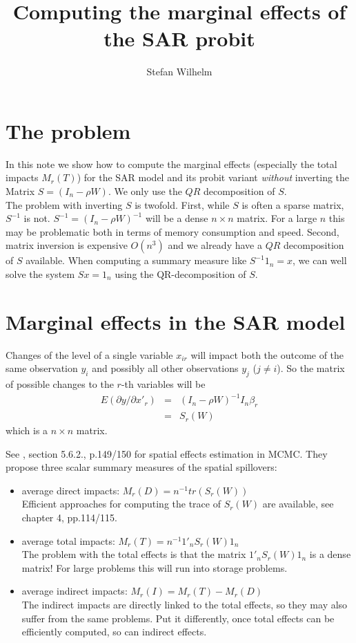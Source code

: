\documentclass[a4paper]{article}
\title{Computing the marginal effects of the SAR probit}
\author{Stefan Wilhelm}
\begin{document}
\maketitle

\section{The problem}
In this note we show how to compute the marginal effects (especially the total impacts $M_r(T)$)
for the SAR model and its probit variant \textit{without} inverting the Matrix $S=(I_n - \rho W)$.
We only use the $QR$ decomposition of $S$.\\
The problem with inverting $S$ is twofold. 
First, while $S$ is often a sparse matrix, $S^{-1}$ is not. $S^{-1}=(I_n - \rho W)^{-1}$ will be a dense
$n \times n$ matrix. For a large $n$ this may be problematic both in terms of memory consumption and speed.
Second, matrix inversion is expensive $O(n^3)$ and we already have a $QR$ decomposition of $S$ available.
When computing a summary measure like $S^{-1} 1_n=x$, we can well solve the system $S x = 1_n$ using the QR-decomposition
of $S$.  

\section{Marginal effects in the SAR model}

Changes of the level of a single variable $x_{ir}$ will impact both the outcome of the same observation $y_i$ and possibly all other
observations $y_j$ ($j \ne i$). So the matrix of possible changes to the $r$-th variables will be
\begin{eqnarray}
E(\partial y / \partial x'_r) & = & (I_n - \rho W)^{-1} I_n \beta_r \\
                              & = & S_r(W) \nonumber
\end{eqnarray}
which is a $n \times n$ matrix.

See \cite{LeSage2009}, section 5.6.2., p.149/150 for spatial effects estimation in MCMC. They propose three scalar summary
measures of the spatial spillovers:
\begin{itemize}
\item average direct impacts: $M_r(D) = n^{-1} tr(S_r(W))$      \\
Efficient approaches for computing the trace of $S_r(W)$ are available, see \cite{LeSage2009} chapter 4, pp.114/115.
\item average total impacts: $M_r(T) = n^{-1} 1'_n S_r(W) 1_n$  \\
 The problem with the total effects is that the matrix $1'_n S_r(W) 1_n$ is a dense matrix! 
 For large problems this will run into storage problems.
\item average indirect impacts: $M_r(I) = M_r(T) - M_r(D)$\\
 The indirect impacts are directly linked to the total effects, so they may also suffer from the same problems.
 Put it differently, once total effects can be efficiently computed, so can indirect effects.
\end{itemize}
\end{document}
